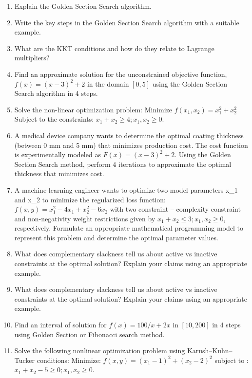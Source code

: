 \documentclass[
  letterpaper,
  DIV=11,
  numbers=noendperiod]{scrreprt}
\begin{document}
\begin{enumerate}
\def\labelenumi{\arabic{enumi}.}
\item
  Explain the Golden Section Search algorithm.
\item
  Write the key steps in the Golden Section Search algorithm with a
  suitable example.
\item
  What are the KKT conditions and how do they relate to Lagrange
  multipliers?
\item
  Find an approximate solution for the unconstrained objective function,
  \(f(x)=(x-3)^2+2\) in the domain \([0,5]\) using the Golden Section
  Search algorithm in 4 steps.
\item
  Solve the non-linear optimization problem: Minimize
  \(f(x_1,x_2 )=x_1^2+x_2^2\) Subject to the constraints:
  \(x_1+x_2\ge 4; x_1,x_2\ge 0\).
\item
  A medical device company wants to determine the optimal coating
  thickness (between 0 mm and 5 mm) that minimizes production cost. The
  cost function is experimentally modeled as \(F(x)=(x-3)^2+2\). Using
  the Golden Section Search method, perform 4 iterations to approximate
  the optimal thickness that minimizes cost.
\item
  A machine learning engineer wants to optimize two model parameters
  x\_1 and x\_2 to minimize the regularized loss function:
  \(f(x,y)=x_1^2-4x_1+x_2^2-6x_2\) with two constraint -- complexity
  constraint and non-negativity weight restrictions given by
  \(x_1+x_2\le 3; x_1,x_2\ge 0\), respectively. Formulate an appropriate
  mathematical programming model to represent this problem and determine
  the optimal parameter values.
\item
  What does complementary slackness tell us about active vs inactive
  constraints at the optimal solution? Explain your claims using an
  appropriate example.
\item
  What does complementary slackness tell us about active vs inactive
  constraints at the optimal solution? Explain your claims using an
  appropriate example.
\item
  Find an interval of solution for \(f(x)=100/x+2x\) in \([10,200]\) in
  4 steps using Golden Section or Fibonacci search method.
\item
  Solve the following nonlinear optimization problem using
  Karush--Kuhn--Tucker conditions: Minimize:
  \(f(x,y)=(x_1-1)^2+(x_2-2)^2\) subject to :
  \(x_1+x_2-5\ge 0;x_1,x_2\ge 0\).
\end{enumerate}
\end{document}
